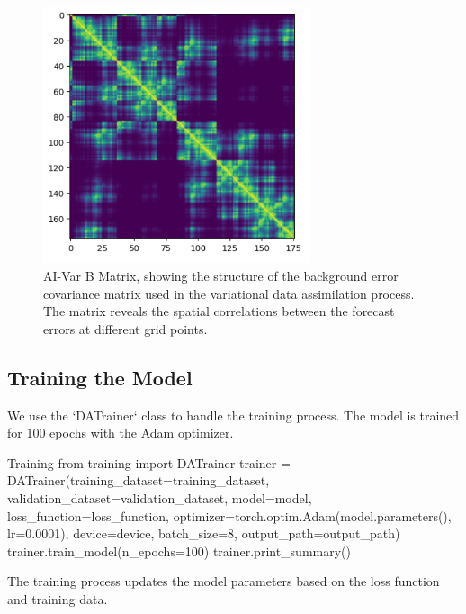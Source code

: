 \begin{figure}[ht]
\centering
\includegraphics[width=0.7\textwidth]{images/aivar_B_matrix.png}
\caption{AI-Var B Matrix, showing the structure of the background error covariance matrix used in the variational data assimilation process. The matrix reveals the spatial correlations between the forecast errors at different grid points.}
\end{figure}

%
\subsection{Training the Model}

We use the `DATrainer` class to handle the training process. The model is trained for 100 epochs with the Adam optimizer.

\begin{codeonly}{Training}
from training import DATrainer
trainer = DATrainer(training_dataset=training_dataset, validation_dataset=validation_dataset, model=model, loss_function=loss_function, optimizer=torch.optim.Adam(model.parameters(), lr=0.0001), device=device, batch_size=8, output_path=output_path)
trainer.train_model(n_epochs=100)
trainer.print_summary()
\end{codeonly}

The training process updates the model parameters based on the loss function and training data.

